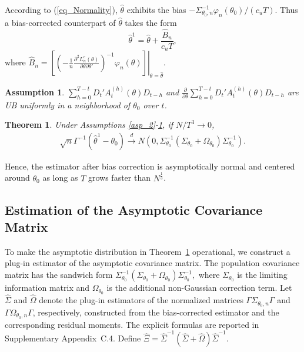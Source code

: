 \documentclass[11pt,a4paper]{article}
\newtheorem{theorem}{Theorem}
\newtheorem{assumption}{Assumption}
\begin{document}
According to (\ref{eq_Normality}), $\hat{\theta}$ exhibits the bias $-\Sigma_{\theta_0,n}^{-1}\varphi_n(\theta_0)/(c_uT)$. Thus a bias-corrected counterpart of $\hat{\theta}$ takes the form
$$\hat{\theta}^1=\hat{\theta}+\frac{\hat{B}_n}{c_uT},$$
where $\hat{B}_n=\left.\left[\left(-\frac{1}{n}\frac{\partial^2L_n^{c}(\theta)}{\partial\theta\partial\theta'}\right)^{-1}\varphi_n(\theta)\right]\right|_{\theta=\hat{\theta}}$.
\begin{assumption}\label{asp_UBAT}
$\sum_{h=0}^{T-t}D_t'A_t^{(h)}(\theta)D_{t-h}$ and $\frac{\partial}{\partial\theta}\sum_{h=0}^{T-t}D_t'A_t^{(h)}(\theta)D_{t-h}$ are UB uniformly in a neighborhood of $\theta_0$ over $t$.
\end{assumption}
\begin{theorem}\label{bias-corrected_Normality}
Under Assumptions \ref{asp_2}-\ref{asp_UBAT}, if $N/T^3\rightarrow0$,
\begin{align*}
\sqrt{n}\Gamma^{-1}\left(\hat{\theta}^1-\theta_0\right)\overset{d}{\rightarrow}N\left(0,\Sigma_{\theta_0}^{-1}(\Sigma_{\theta_0}+\Omega_{\theta_0})\Sigma_{\theta_0}^{-1}\right).%
\end{align*}
\end{theorem}
Hence, the estimator after bias correction is asymptotically normal and centered around $\theta_0$ as long as $T$ grows faster than $N^{\frac{1}{3}}$. 


\subsection{Estimation of the Asymptotic Covariance Matrix}

To make the asymptotic distribution in Theorem~\ref{bias-corrected_Normality} operational, we construct a
plug-in estimator of the asymptotic covariance matrix. The population covariance
matrix has the sandwich form
\(
\Sigma_{\theta_0}^{-1}
(\Sigma_{\theta_0}+\Omega_{\theta_0})
\Sigma_{\theta_0}^{-1},
\)
where \(\Sigma_{\theta_0}\) is the limiting information matrix and
\(\Omega_{\theta_0}\) is the additional non-Gaussian correction term. Let
\(\widehat{\Sigma}\) and \(\widehat{\Omega}\) denote the plug-in estimators of
the normalized matrices \(\Gamma\Sigma_{\theta_0,n}\Gamma\) and
\(\Gamma\Omega_{\theta_0,n}\Gamma\), respectively, constructed from the
bias-corrected estimator and the corresponding residual moments. The
explicit formulas are reported in Supplementary Appendix~C.4. Define
\(
\widehat{\Xi}
=
\widehat{\Sigma}^{-1}
(\widehat{\Sigma}+\widehat{\Omega})
\widehat{\Sigma}^{-1}.
\)
\end{document}
